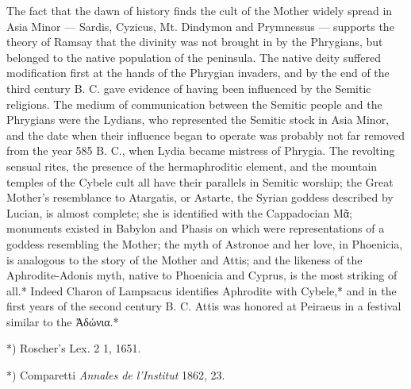 \documentclass[a4paper, 11pt, oneside, polutonikogreek, english]{article}
\begin{document}
The fact that the dawn of history finds the cult of the Mother widely spread in Asia Minor --- Sardis, Cyzicus, Mt. Dindymon and Prymnessus --- supports the theory of Ramsay that the divinity was not brought in by the Phrygians, but belonged to the native population of the peninsula. The native deity suffered modification first at the hands of the Phrygian invaders, and by the end of the third century B. C. gave evidence of having been influenced by the Semitic religions. The medium of communication between the Semitic people and the Phrygians were the Lydians, who represented the Semitic stock in Asia Minor, and the date when their influence began to operate was probably not far removed from the year 585 B. C., when Lydia became mistress of Phrygia. The revolting sensual rites, the presence of the hermaphroditic element, and the mountain temples of the Cybele cult all have their parallels in Semitic worship; the Great Mother's resemblance to Atargatis, or Astarte, the Syrian goddess described by Lucian, is almost complete; she is identified with the Cappadocian Μᾶ; monuments existed in Babylon and Phasis on which were representations of a goddess resembling the Mother; the myth of Astronoe and her love, in Phoenicia, is analogous to the story of the Mother and Attis; and the likeness of the Aphrodite-Adonis myth, native to Phoenicia and Cyprus, is the most striking of all.* Indeed Charon of Lampsacus identifies Aphrodite with Cybele,* and in the first years of the second century B. C. Attis was honored at Peiraeus in a festival similar to the Ἀδώνια.*

*) Roscher's Lex. 2 1, 1651.


*) Comparetti \emph{Annales de l'Institut} 1862, 23.
\end{document}
